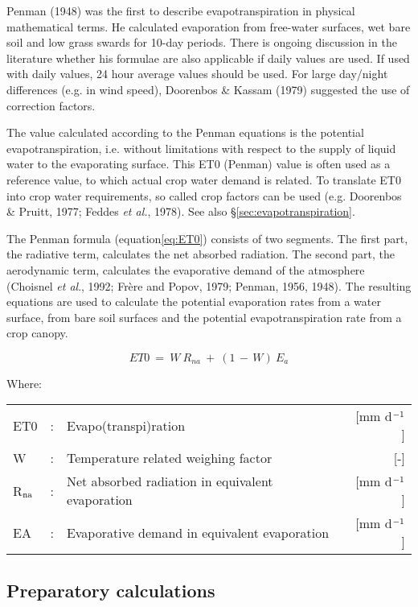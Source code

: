 Penman (1948) was the first to describe evapotranspiration in physical mathematical
terms. He calculated evaporation from free-water surfaces, wet bare soil and low grass
swards for 10-day periods. There is ongoing discussion in the literature whether his
formulae are also applicable if daily values are used. If used with daily values, 24 hour
average values should be used. For large day/night differences (e.g. in wind speed),
Dooren\-bos \& Kassam (1979) suggested the use of correction factors.

The value calculated according to the Penman equations is the potential evapotranspiration, i.e. without limitations with respect to the supply of liquid water to the
evaporating surface. This ET0 (Penman) value is often used as a reference value, to
which actual crop water demand is related. To translate ET0 into crop water require\-ments,
 so called crop factors can be used (e.g. Doorenbos \& Pruitt, 1977; Feddes {\it et al.},
1978). See also \S \ref{sec:evapotranspiration}.

The Penman formula (equation\ref{eq:ET0}) consists of two segments. The first part, the radiative
term, calculates the net absorbed radiation. The second part, the aerodynamic term,
calculates the evapora\-tive demand of the atmo\-sphere (Choisnel {\it et al}., 1992; Fr\`{e}re and
Popov, 1979; Penman, 1956, 1948). The resulting equations are used to calculate the
potential evapora\-tion rates from a water surface, from bare soil surfaces and the potential
evapotranspira\-tion rate from a crop canopy.


\begin{equation}
\label{eq:ET0}
ET0 ~=~ W ~R _{na} ~+~(1\, -\, W) ~E _{a} 
\end{equation}

Where:\\[5pt]
\begin{tabularx}{\textwidth}{llXr}
ET0&:& Evapo(transpi)ration & [mm d$^{{\rm -1}}$] \\
W&:& Temperature related weighing factor &  [-] \\
R$_{{\rm na}}$&: & Net absorbed radiation in equivalent evaporation & [mm d$^{{\rm -1}}$] \\
EA&: &  Evaporative demand in equivalent evaporation & [mm d$^{{\rm -1}}$] \\
\end{tabularx}

\subsection{Preparatory calculations}

